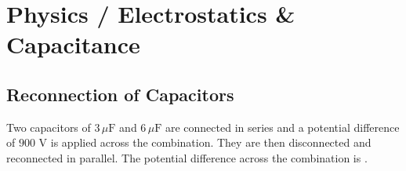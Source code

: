 \clearpage


    

\section{Physics / Electrostatics \& Capacitance}


\subsection{Reconnection of Capacitors}


Two capacitors of $3\,\mu\text{F}$ and $6\,\mu\text{F}$ are connected in series and a potential difference of $900\text{ V}$ is applied across the combination. They are then disconnected and reconnected in parallel. The potential difference across the combination is \underline{\hspace{2cm}}.

